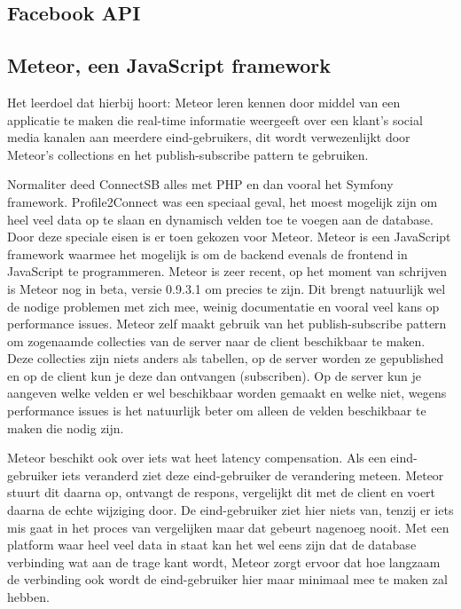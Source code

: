 \subsection{Facebook API}

\clearpage

\subsection{Meteor, een JavaScript framework}
Het leerdoel dat hierbij hoort: Meteor leren kennen door middel van een applicatie te maken die real-time informatie weergeeft over een klant’s social media kanalen aan meerdere eind-gebruikers, dit wordt verwezenlijkt door Meteor’s collections en het publish-subscribe pattern te gebruiken.

Normaliter deed ConnectSB alles met PHP en dan vooral het Symfony framework. Profile2Connect was een speciaal geval, het moest mogelijk zijn om heel veel data op te slaan en dynamisch velden toe te voegen aan de database. Door deze speciale eisen is er toen gekozen voor Meteor. Meteor is een JavaScript framework waarmee het mogelijk is om de backend evenals de frontend in JavaScript te programmeren. Meteor is zeer recent, op het moment van schrijven is Meteor nog in beta, versie 0.9.3.1 om precies te zijn. Dit brengt natuurlijk wel de nodige problemen met zich mee, weinig documentatie en vooral veel kans op performance issues. Meteor zelf maakt gebruik van het publish-subscribe pattern om zogenaamde collecties van de server naar de client beschikbaar te maken. Deze collecties zijn niets anders als tabellen, op de server worden ze gepublished en op de client kun je deze dan ontvangen (subscriben). Op de server kun je aangeven welke velden er wel beschikbaar worden gemaakt en welke niet, wegens performance issues is het natuurlijk beter om alleen de velden beschikbaar te maken die nodig zijn.

\newline

Meteor beschikt ook over iets wat heet latency compensation. Als een eind-gebruiker iets veranderd ziet deze eind-gebruiker de verandering meteen. Meteor stuurt dit daarna op, ontvangt de respons, vergelijkt dit met de client en voert daarna de echte wijziging door. De eind-gebruiker ziet hier niets van, tenzij er iets mis gaat in het proces van vergelijken maar dat gebeurt nagenoeg nooit. Met een platform waar heel veel data in staat kan het wel eens zijn dat de database verbinding wat aan de trage kant wordt, Meteor zorgt ervoor dat hoe langzaam de verbinding ook wordt de eind-gebruiker hier maar minimaal mee te maken zal hebben.


